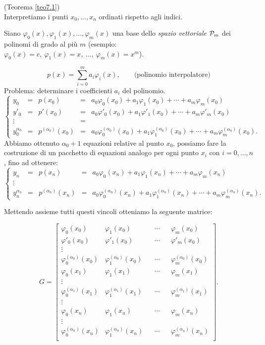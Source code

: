\begin{dimo} (Teorema \ref{teo7.1})\\
Interpretiamo i punti $x_0, \ldots, x_n$ ordinati rispetto agli indici.

Siano $\varphi_0(x), \varphi_1(x), \ldots, \varphi_m(x)$ una base dello
\emph{spazio vettoriale} $\mathcal{P}_m$ dei polinomi di grado al più $m$
(esempio: $\varphi_0(x) = c,\ \varphi_1(x) = x,\ \ldots,\ \varphi_m(x)= x^m$).

\[
p(x) = \sum_{i = 0}^{m}a_i\varphi_i(x), \qquad \textrm{(polinomio interpolatore)
}
\]
Problema: determinare i coefficienti $a_i$ del polinomio.
\[
\left\{
\begin{array}{ccccl}
y_0         & = & p(x_0)        &= & a_0\varphi_0(x_0) + a_1\varphi_1(x_0)+
\cdots + a_m\varphi_m(x_0)  \\
y'_0        & = & p'(x_0)       &= &a_0\varphi'_0(x_0) + a_1\varphi'_1(x_0)+
\cdots + a_m\varphi'_m(x_0)  \\
\vdots      &   &             &= &  \\
y_0^{\alpha_0}& = & p^{(\alpha_0)}(x_0)&= & a_0\varphi_0^{(\alpha_0)}(x_0) +
a_1\varphi_1^{(\alpha_0)}(x_0)+ \cdots + a_m\varphi_m^{(\alpha_0)}(x_0).
\end{array}\right.
\]
Abbiamo ottenuto $\alpha_0 +1$ equazioni relative al punto $x_0$, possiamo
fare la costruzione di un pacchetto di equazioni analogo per ogni punto
$x_i$ con $i = 0, \ldots, n$, fino ad ottenere:
\[
\left\{
\begin{array}{ccccl}
y_n         & = & p(x_n)        &= & a_0\varphi_0(x_n) + a_1\varphi_1(x_n)+
\cdots + a_m\varphi_m(x_n)  \\
\vdots      &   &             & &  \\
y_n^{\alpha_n}& = & p^{(\alpha_n)}(x_n)&= & a_0\varphi_0^{(\alpha_n)}(x_n) +
a_1\varphi_1^{(\alpha_n)}(x_n)+ \cdots + a_m\varphi_m^{(\alpha_n)}(x_n).
\end{array}\right.
\]

Mettendo assieme tutti questi vincoli otteniamo la seguente matrice:

\[
G = \left[
\begin{array}{cccccc}
\varphi_0(x_0) & \varphi_1(x_0) & & \cdots & & \varphi_m(x_0) \\
\varphi'_0(x_0) & \varphi'_1(x_0) & & \cdots & & \varphi'_m(x_0) \\
\vdots \\
\varphi_0^{(\alpha_0)}(x_0) & \varphi_1^{(\alpha_0)}(x_0) & & \cdots & &
\varphi_m^{(\alpha_0)}(x_0) \\
\varphi_0(x_1) & \varphi_1(x_1) & & \cdots & & \varphi_m(x_1) \\
\vdots \\
\varphi_0^{(\alpha_1)}(x_1) & \varphi_1^{(\alpha_1)}(x_1) & & \cdots & &
\varphi_m^{(\alpha_1)}(x_1) \\
\vdots \\
\varphi_0(x_n) & \varphi_1(x_n) & & \cdots & & \varphi_m(x_n) \\
\vdots \\
\varphi_0^{(\alpha_n)}(x_n) & \varphi_1^{(\alpha_n)}(x_n) & & \cdots & &
\varphi_m^{(\alpha_n)}(x_n) \\
\end{array}\right].
\]


\end{dimo}
